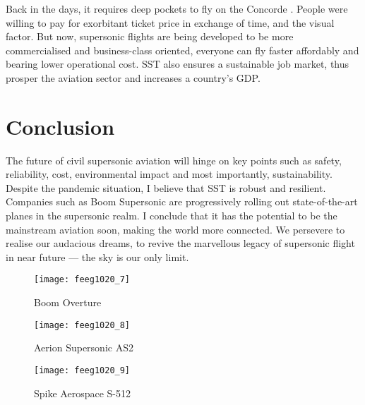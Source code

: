 \documentclass[a4paper,11pt]{article}
\begin{document}
Back in the days, it requires deep pockets to fly on the Concorde \cite{concordemoney}. People were willing to pay for exorbitant ticket price in exchange of time, and the visual factor. But now, supersonic flights are being developed to be more commercialised and business-class oriented, everyone can fly faster affordably and bearing lower operational cost. SST also ensures a sustainable job market, thus prosper the aviation sector and increases a country’s GDP.\\

\newpage

\section{Conclusion}

The future of civil supersonic aviation will hinge on key points such as safety, reliability, cost, environmental impact \cite{keane} and most importantly, sustainability. Despite the pandemic situation, I believe that SST is robust and resilient.\\

Companies such as Boom Supersonic are progressively rolling out state-of-the-art planes in the supersonic realm. I conclude that it has the potential to be the mainstream aviation soon, making the world more connected. We persevere to realise our audacious dreams, to revive the marvellous legacy of supersonic flight in near future --- the sky is our only limit.\\

\vspace{1cm}

\begin{figure}[h] 
\texttt{[image: feeg1020\_7]}
\centering
\caption{Boom Overture \cite{picture7}}
\end{figure}

\begin{figure}[h] 
\texttt{[image: feeg1020\_8]}
\centering
\caption{Aerion Supersonic AS2 \cite{picture8}}
\end{figure}

\begin{figure}[h] 
\texttt{[image: feeg1020\_9]}
\centering
\caption{Spike Aerospace S-512 \cite{picture9}}
\end{figure}

\newpage
\end{document}
